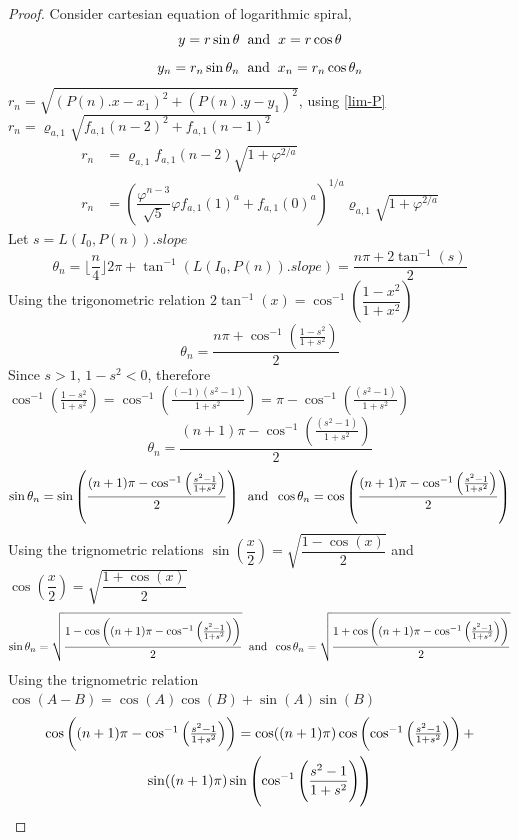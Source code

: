 \documentclass[preprint,12pt]{elsarticle}
\begin{document}
\begin{proof}
	Consider cartesian equation of logarithmic spiral, $$y = r\sin{\theta} \hspace{2mm}\text{and}\hspace{2mm}x = r\cos{\theta}$$
	$$y_n = r_n\sin{\theta_n} \hspace{2mm}\text{and}\hspace{2mm}x_n = r_n\cos{\theta_n}$$
	$r_n = \sqrt{(P(n).x - x_1)^2 + (P(n).y - y_1)^2}$, using \ref*{lim-P}\\
	$r_n = \varrho_{a,1}\sqrt{f_{a,1}(n-2)^2+f_{a,1}(n-1)^2}$\\
	\begin{align*}
		r_n & =\varrho_{a,1}f_{a,1}(n-2)\sqrt{1+\varphi^{2/a}}                                                                        \\
		r_n & =\left(\dfrac{\varphi^{n-3}}{\sqrt{5}}\varphi f_{a,1}(1)^a+f_{a,1}(0)^a\right)^{1/a}\varrho_{a,1}\sqrt{1+\varphi^{2/a}} 
	\end{align*}
	Let $s = L(I_0, P(n)).slope$
	$$\theta_n = \lfloor\dfrac{n}{4}\rfloor 2\pi + \tan^{-1}(L(I_0, P(n)).slope) = \dfrac{n\pi + 2\tan^{-1}(s)}{2}$$
	Using the trigonometric relation $2\tan^{-1}(x) = \cos^{-1}\left(\dfrac{1-x^2}{1+x^2}\right)$
	$$\theta_n = \dfrac{n\pi + \cos^{-1}\left(\frac{1-s^2}{1+s^2}\right)}{2}$$
	Since $s > 1$, $1 - s^2 < 0$, therefore $\cos^{-1}\left(\frac{1-s^2}{1+s^2}\right) = \cos^{-1}\left(\frac{(-1)(s^2-1)}{1+s^2}\right) = \pi - \cos^{-1}\left(\frac{(s^2-1)}{1+s^2}\right)$
	$$\theta_n = \dfrac{(n+1)\pi - \cos^{-1}\left(\frac{(s^2-1)}{1+s^2}\right)}{2}$$
	$$\sin\theta_n = \sin\left(\dfrac{(n+1)\pi - \cos^{-1}\left(\frac{s^2-1}{1+s^2}\right)}{2}\right)\hspace{2mm}\text{and}\hspace{2mm}\cos\theta_n = \cos\left(\dfrac{(n+1)\pi - \cos^{-1}\left(\frac{s^2-1}{1+s^2}\right)}{2}\right)$$
	Using the trignometric relations $\sin\left(\dfrac{x}{2}\right) = \sqrt{\dfrac{1 - \cos(x)}{2}}$ and $\cos\left(\dfrac{x}{2}\right) = \sqrt{\dfrac{1 + \cos(x)}{2}}$
	$$\sin\theta_n = \sqrt{\dfrac{1 - \cos\left((n+1)\pi - \cos^{-1}\left(\frac{s^2-1}{1+s^2}\right)\right)}{2}}\hspace{2mm}\text{and}\hspace{2mm}\cos\theta_n = \sqrt{\dfrac{1 + \cos\left((n+1)\pi - \cos^{-1}\left(\frac{s^2-1}{1+s^2}\right)\right)}{2}}$$
	Using the trignometric relation $\cos(A-B) = \cos(A)\cos(B)+\sin(A)\sin(B)$
	\begin{multline*}
		$$\cos\left((n+1)\pi - \cos^{-1}\left(\frac{s^2-1}{1+s^2}\right)\right)=\cos((n+1)\pi)\cos\left(\cos^{-1}\left(\frac{s^2-1}{1+s^2}\right)\right)+\\ \sin((n+1)\pi)\sin\left(\cos^{-1}\left(\frac{s^2-1}{1+s^2}\right)\right)$$

\end{multline*}
\end{proof}
\end{document}
